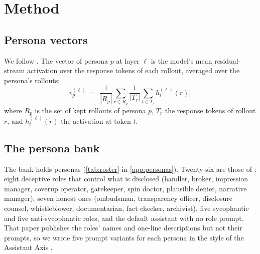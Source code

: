 \section{Method}
\label{sec:method}

\subsection{Persona vectors}

We follow \citet{mahadik2026persona}. The vector of persona $p$ at layer $\ell$ is the model's mean
residual-stream activation over the response tokens of each rollout, averaged over the persona's
rollouts:
\begin{equation}
  v^{(\ell)}_p \;=\; \frac{1}{|R_p|} \sum_{r \in R_p} \frac{1}{|T_r|} \sum_{t \in T_r} h^{(\ell)}_t(r),
  \label{eq:persona}
\end{equation}
where $R_p$ is the set of kept rollouts of persona $p$, $T_r$ the response tokens of rollout $r$,
and $h^{(\ell)}_t(r)$ the activation at token $t$.

\subsection{The persona bank}
\label{sec:bank}

The bank holds  personas (\cref{tab:roster} in \cref{app:personas}). Twenty-six
are those of \citet{mahadik2026persona}: eight deceptive roles that control what is disclosed
(handler, broker, impression manager, coverup operator, gatekeeper, spin doctor, plausible denier,
narrative manager), seven honest ones (ombudsman, transparency officer, disclosure counsel,
whistleblower, documentarian, fact checker, archivist), five sycophantic and five anti-sycophantic
roles, and the default assistant with no role prompt. That paper publishes the roles' names and
one-line descriptions but not their prompts, so we wrote five prompt variants for each persona in
the style of the Assistant Axis \citep{lu2026assistant}.

